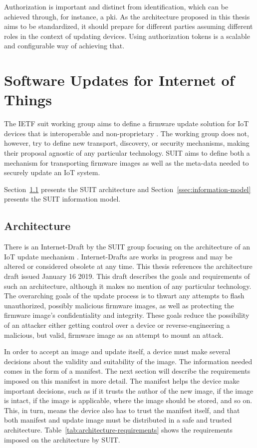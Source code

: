 \documentclass[0-thesis.tex]{subfiles}
\begin{document}
Authorization is important and distinct from identification, which can be achieved
through, for instance, a \gls{pki}. As the architecture proposed in this thesis aims to be
standardized, it should prepare for different parties assuming different roles in the
context of updating devices. Using authorization tokens is a scalable and configurable way
of achieving that.

\section{Software Updates for Internet of Things}
\label{sec:suit}
The IETF \acrfull{suit} working group aims to define a firmware update solution for IoT
devices that is interoperable and non-proprietary \parencite{suit}. The working group does
not, however, try to define new transport, discovery, or security mechanisms, making their
proposal agnostic of any particular technology. SUIT aims to define both a mechanism for
transporting firmware images as well as the meta-data needed to securely update an IoT
system.

Section~\ref{ssec:architecture} presents the SUIT architecture and
Section~\ref{ssec:information-model} presents the SUIT information model.

\subsection{Architecture}
\label{ssec:architecture}
There is an Internet-Draft by the SUIT group focusing on the architecture of an IoT update
mechanism \parencite{suit-architecture}. Internet-Drafts are works in progress and may be
altered or considered obsolete at any time. This thesis references the architecture draft
issued January 16 2019. This draft describes the goals and requirements of such an
architecture, although it makes no mention of any particular technology. The overarching
goals of the update process is to thwart any attempts to flash unauthorized, possibly
malicious firmware images, as well as protecting the firmware image's confidentiality and
integrity. These goals reduce the possibility of an attacker either getting control over
a device or reverse-engineering a malicious, but valid, firmware image as an attempt to
mount an attack.

In order to accept an image and update itself, a device must make several decisions about
the validity and suitability of the image. The information needed comes in the form of a
manifest. The next section will describe the requirements imposed on this manifest in
more detail. The manifest helps the device make important decisions, such as if it trusts
the author of the new image, if the image is intact, if the image is applicable, where the
image should be stored, and so on. This, in turn, means the device also has to trust the
manifest itself, and that both manifest and update image must be distributed in a safe and
trusted architecture. Table~\ref{tab:architecture-requirements} shows the requirements
imposed on the architecture by SUIT.
\end{document}

